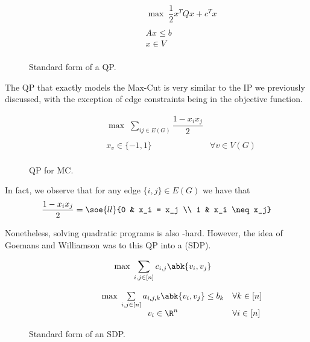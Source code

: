 \documentclass[a4paper, 12pt]{report}
\begin{document}
    \begin{figure}[H]
        \centering
        \[\begin{array}{ccl}
            \qquad\qquad\quad
            & \max \; \dfrac{1}{2} x^TQx + c^Tx \\\\
            & Ax \le b \\
            & x \in V \\
        \end{array}\]
        \caption{Standard form of a QP.}
    \end{figure}

    The QP that exactly models the Max-Cut is very similar to the IP we previously discussed, with the exception of edge constraints being  in the objective function.

    \begin{figure}[H]
        \centering
        \[\begin{array}{ccl}
            \qquad\qquad\quad
            & \max \; \displaystyle \sum_{ij \in E(G)}{\dfrac{1 - x_i x_j}{2}} \\\\
            & x_v \in \{-1, 1\} & \forall v \in V(G) \\
        \end{array}\]
        \caption{QP for MC.}
    \end{figure}

    In fact, we observe that for any edge $\{i, j\} \in E(G)$ we have that $$\dfrac{1 - x_ix_j}{2} = \soe{ll}{0 & x_i = x_j \\ 1 & x_i \neq x_j}$$

    Nonetheless, solving quadratic programs is also \NPclass-hard. However, the  idea of Goemans and Williamson was to  this QP into a  (SDP).

    \begin{figure}[H]
        \centering
        \[\begin{array}{ccl}
            \qquad\qquad\quad
            & \max \; \displaystyle \sum_{i,j \in [n]}{c_{i, j } \abk{v_i, v_j}} \\\\
            & \max \; \sum\limits_{i, j \in [n]}{a_{i, j , k} \abk{v_i, v_j}} \le b_k & \forall k \in [n] \\
            & v_i \in \R^n & \forall i \in [n]\\
        \end{array}\]
        \caption{Standard form of an SDP.}
    \end{figure}
\end{document}
